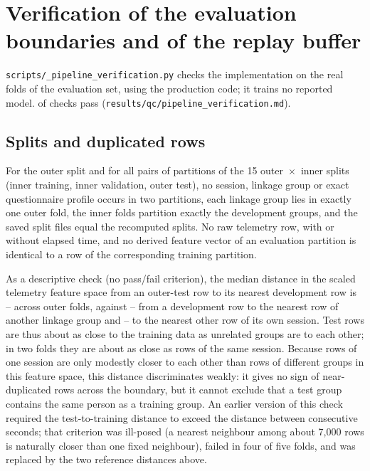 \section{Verification of the evaluation boundaries and of the replay buffer}
\label{sec:s-verify}
\texttt{scripts/\_pipeline\_verification.py} checks the implementation on the real folds of the evaluation set, using the production code; it trains no reported model. \PVChecksPass{} of \PVChecks{} checks pass (\texttt{results/\allowbreak qc/\allowbreak pipeline\_verification.md}).

\subsection{Splits and duplicated rows}
For the outer split and for all \PVSplitPairs{} pairs of partitions of the 15 outer~$\times$~inner splits (inner training, inner validation, outer test), no session, linkage group or exact questionnaire profile occurs in two partitions, each linkage group lies in exactly one outer fold, the inner folds partition exactly the development groups, and the saved split files equal the recomputed splits. No raw telemetry row, with or without elapsed time, and no derived feature vector of an evaluation partition is identical to a row of the corresponding training partition.

As a descriptive check (no pass/fail criterion), the median distance in the scaled telemetry feature space from an outer-test row to its nearest development row is \PVNNTestMin--\PVNNTestMax{} across outer folds, against \PVNNOtherMin--\PVNNOtherMax{} from a development row to the nearest row of another linkage group and \PVNNOwnMin--\PVNNOwnMax{} to the nearest other row of its own session. Test rows are thus about as close to the training data as unrelated groups are to each other; in two folds they are about as close as rows of the same session. Because rows of one session are only modestly closer to each other than rows of different groups in this feature space, this distance discriminates weakly: it gives no sign of near-duplicated rows across the boundary, but it cannot exclude that a test group contains the same person as a training group. An earlier version of this check required the test-to-training distance to exceed the distance between consecutive seconds; that criterion was ill-posed (a nearest neighbour among about 7,000 rows is naturally closer than one fixed neighbour), failed in four of five folds, and was replaced by the two reference distances above.


